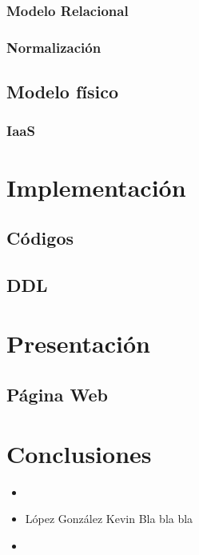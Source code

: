 \documentclass[12pt,letterpaper]{article}
\begin{document}
			\subsubsection{Modelo Relacional}
			
			\subsubsection{Normalización}
			
		\subsection{Modelo físico}
		
			\subsubsection{IaaS}
		
	\section{Implementación}
	
		\subsection{Códigos}
		
		\subsection{DDL}
	
	\section{Presentación}
		\subsection{Página Web}
	
	\section{Conclusiones}
		\begin{itemize}
			\item 
				\subitem 
				
			\item López González Kevin
				\subitem Bla bla bla

			\item 
				\subitem
		\end{itemize}
	
\end{document}
